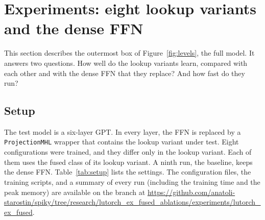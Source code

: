 \documentclass[11pt]{article}
\DeclareRobustCommand{\code}[1]{{\renewcommand{\_}{\textunderscore\allowbreak}\texttt{#1}}}
\begin{document}
\section{Experiments: eight lookup variants and the dense FFN}
\label{sec:ml}

This section describes the outermost box of Figure~\ref{fig:levels}, the full model. It answers two
questions. How well do the lookup variants learn, compared with each other and with the dense FFN that
they replace? And how fast do they run?

\subsection{Setup}

The test model is a six-layer GPT. In every layer, the FFN is replaced by a \code{ProjectionMHL} wrapper
that contains the lookup variant under test. Eight configurations were trained, and they differ only in
the lookup variant. Each of them uses the fused class of its lookup variant. A ninth run, the baseline,
keeps the dense FFN. Table~\ref{tab:setup} lists the settings. The configuration files, the training
scripts, and a summary of every run (including the training time and the peak memory) are available on the
branch at
\url{https://github.com/anatoli-starostin/spiky/tree/research/lutorch_ex_fused_ablations/experiments/lutorch_ex_fused}.
\end{document}
